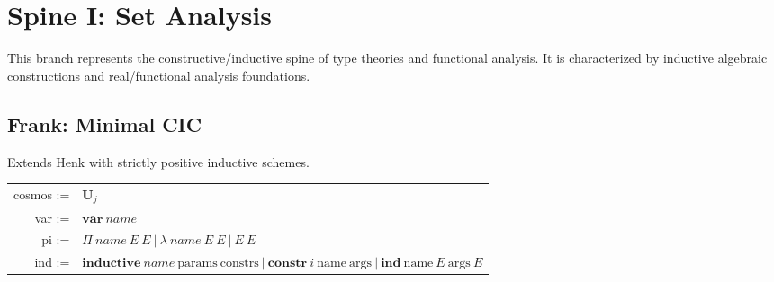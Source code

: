 \documentclass{article}
\theoremstyle{definition}
\theoremstyle{plain}
\begin{document}
\begin{lrbox}{\diagbox}
\scriptsize
{}%
\end{lrbox}
\noindent\makebox[\textwidth][c]{\usebox{\diagbox}}


\newpage
\section{Spine I: Set Analysis}
This branch represents the constructive/inductive spine of type theories and functional analysis. It is characterized by inductive algebraic constructions and real/functional analysis foundations.

\subsection{Frank: Minimal CIC}
Extends Henk with strictly positive inductive schemes.
\begin{table}[ht!]
\centering
\begin{tabular}{rl}
 cosmos :=&$\textbf{U}_j$ \\
    var :=&$\textbf{var}\ name$ \\
     pi :=&$\Pi\ name\ E\ E\ |\ \lambda\ name\ E\ E\ |\ E\ E$ \\
    ind :=&$\textbf{inductive}\ name\ \textrm{params}\ \textrm{constrs}\ |\ \textbf{constr}\ i\ \textrm{name}\ \textrm{args}\ |\ \textbf{ind}\ \textrm{name}\ E\ \textrm{args}\ E$ \\
\end{tabular}
\end{table}
\end{document}
